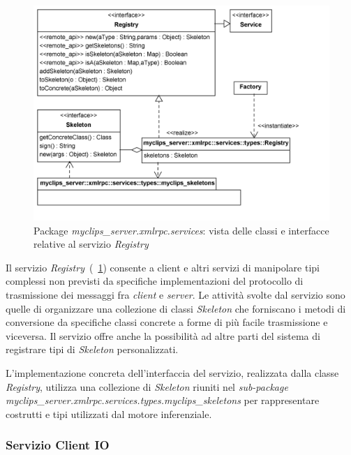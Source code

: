 \begin{figure}[h]
\centering
\includegraphics[width=1\textwidth]{Immagini/Capitolo3/Classi/myclips_server_services_Registry.png}
\caption{Package \emph{myclips\_server.xmlrpc.services}: vista delle classi e interfacce relative al servizio \emph{Registry}}\label{fig:class-myclips-server-services-registry}
\end{figure}

Il servizio \emph{Registry}~(\figurename~\ref{fig:class-myclips-server-services-registry}) consente a client e altri servizi di manipolare tipi complessi non previsti da specifiche implementazioni del protocollo di trasmissione dei messaggi fra \emph{client} e \emph{server}. Le attività svolte dal servizio sono quelle di organizzare una collezione di classi \emph{Skeleton} che forniscano i metodi di conversione da specifiche classi concrete a forme di più facile trasmissione e viceversa.
Il servizio offre anche la possibilità ad altre parti del sistema di registrare tipi di \emph{Skeleton} personalizzati.

L'implementazione concreta dell'interfaccia del servizio, realizzata dalla classe \emph{Registry}, utilizza una collezione di \emph{Skeleton} riuniti nel \emph{sub-package} \emph{myclips\_server.xmlrpc.services.types.myclips\_skeletons} per rappresentare costrutti e tipi utilizzati dal motore inferenziale.

\subsubsection{Servizio Client IO}

